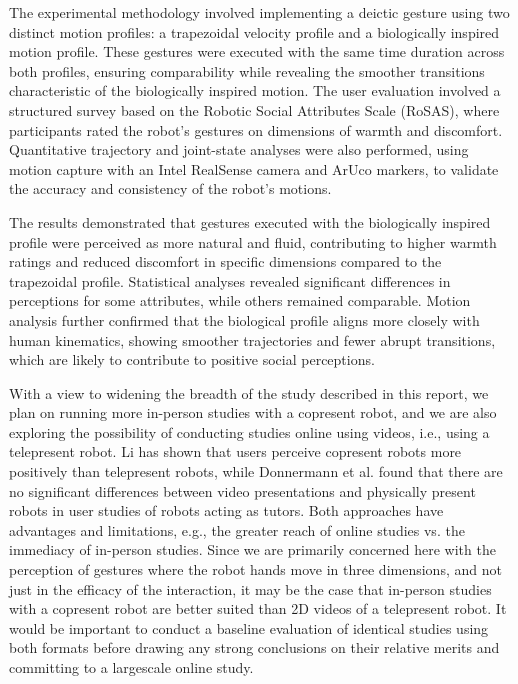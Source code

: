 \documentclass{CSSRforAfrica}
\begin{document}
The experimental methodology involved implementing a deictic gesture using two distinct motion profiles: a trapezoidal velocity profile and a biologically inspired motion profile. These gestures were executed with the same time duration across both profiles, ensuring comparability while revealing the smoother transitions characteristic of the biologically inspired motion. The user evaluation involved a structured survey based on the Robotic Social Attributes Scale (RoSAS), where participants rated the robot's gestures on dimensions of warmth and discomfort. Quantitative trajectory and joint-state analyses were also performed, using motion capture with an Intel RealSense camera and ArUco markers, to validate the accuracy and consistency of the robot’s motions.

The results demonstrated that gestures executed with the biologically inspired profile were perceived as more natural and fluid, contributing to higher warmth ratings and reduced discomfort in specific dimensions compared to the trapezoidal profile. Statistical analyses revealed significant differences in perceptions for some attributes, while others remained comparable. Motion analysis further confirmed that the biological profile aligns more closely with human kinematics, showing smoother trajectories and fewer abrupt transitions, which are likely to contribute to positive social perceptions.

With a view to widening the breadth of the study described in this report, we plan on running more in-person studies with a copresent robot, and we are also exploring the possibility of conducting studies online using videos, i.e., using a telepresent robot. Li \cite{Li2015} has shown that users perceive copresent robots more positively than telepresent robots, while Donnermann et al. \cite{Donnermannetal2024}  found that there are no significant differences between video presentations and physically present robots in user studies of robots acting as tutors. Both approaches have advantages and limitations, e.g., the greater reach of online studies vs. the immediacy of in-person studies.  Since we are primarily concerned here with the perception of gestures where the robot hands move in three dimensions, and not just in the efficacy of the interaction, it may be the case that in-person studies with a copresent robot are better suited than 2D videos of a telepresent robot.  It would be important to conduct a baseline evaluation of identical studies using both formats before drawing any strong conclusions on their relative merits and committing to a largescale online study.
\end{document}
